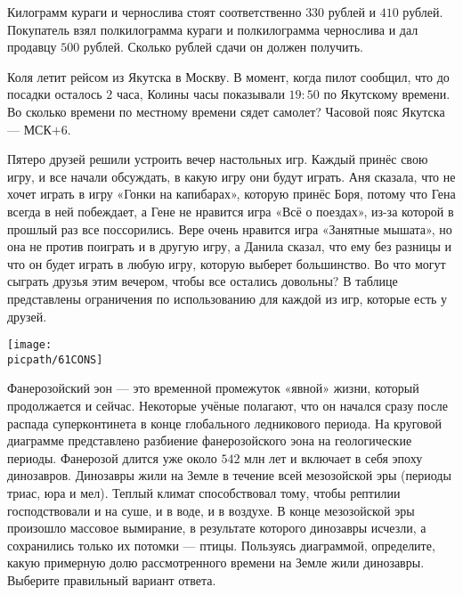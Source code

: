 \begin{consultation}
\begin{listofex}
		\item Килограмм кураги и чернослива стоят соответственно \(330\) рублей и \(410\) рублей. Покупатель взял полкилограмма кураги и полкилограмма чернослива и дал продавцу \(500\) рублей. Сколько рублей сдачи он должен получить.
		\item Коля летит рейсом из Якутска в Москву. В момент, когда пилот сообщил, что до посадки осталось \(2\) часа, Колины часы показывали \(19:50\) по Якутскому времени. Во сколько времени по местному времени сядет самолет? Часовой пояс Якутска --- МСК\(+6\).
		\item
		\begin{minipage}[t]{160pt}
		Пятеро друзей решили устроить вечер настольных игр. Каждый принёс свою игру, и все начали обсуждать, в какую игру они будут играть. Аня сказала, что не хочет играть в игру «Гонки на капибарах», которую принёс Боря, потому что Гена всегда в ней побеждает, а Гене не нравится игра «Всё о поездах», из-за которой в прошлый раз все поссорились. Вере очень нравится игра «Занятные мышата», но она не против поиграть и в другую игру, а Данила сказал, что ему без разницы и что он будет играть в любую игру, которую выберет большинство. Во что могут сыграть друзья этим вечером, чтобы все остались довольны? В таблице представлены ограничения по использованию для каждой из игр, которые есть у друзей.
		\end{minipage}
		\hspace{0.01\linewidth}
		\begin{minipage}[t]{140pt}
			\texttt{[image: \\picpath/61CONS]}
		\end{minipage}
		
			\item Фанерозойский эон --- это временной промежуток «явной» жизни, который продолжается и сейчас. Некоторые учёные полагают, что он начался сразу после распада суперконтинета в конце глобального ледникового периода. На круговой диаграмме представлено разбиение фанерозойского эона на геологические периоды. Фанерозой длится уже около \(542\) млн лет и включает в себя эпоху динозавров. Динозавры жили на Земле в течение всей мезозойской эры (периоды триас, юра и мел). Теплый климат способствовал тому, чтобы рептилии господствовали и на суше, и в воде, и в воздухе. В конце мезозойской эры произошло массовое вымирание, в результате которого динозавры исчезли, а сохранились только их потомки --- птицы. Пользуясь диаграммой, определите, какую примерную долю рассмотренного времени на Земле жили динозавры. Выберите правильный вариант ответа.
		

\end{listofex}
\end{consultation}
